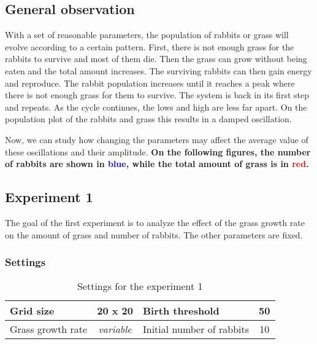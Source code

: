 \documentclass[11pt]{article}
\begin{document}


\subsection{General observation}
With a set of reasonable parameters, the population of rabbits or grass will evolve according to a certain pattern. First, there is not enough grass for the rabbits to survive and most of them die. Then the grass can grow without being eaten and the total amount increases. The surviving rabbits can then gain energy and reproduce. The rabbit population increases until it reaches a peak where there is not enough grass for them to survive. The system is back in its first step and repeats. As the cycle continues, the lows and high are less far apart. On the population plot of the rabbits and grass this results in a damped oscillation. 

Now, we can study how changing the parameters may affect the average value of these oscillations and their amplitude. \textbf{On the following figures, the number of rabbits are shown in \textcolor{blue}{blue}, while the total amount of grass is in \textcolor{red}{red}.}

\subsection{Experiment 1}
The goal of the first experiment is to analyze the effect of the grass growth rate on the amount of grass and number of rabbits. The other parameters are fixed.

\subsubsection{Settings}

\begin{table}[H]
\centering
\begin{tabular}{|l|c||l|c|}
\hline
Grid size         & 20 x 20             & Birth threshold           & 50 \\ \hline
Grass growth rate & \textit{variable}   & Initial number of rabbits & 10 \\ \hline
\end{tabular}
\caption{Settings for the experiment 1}
\end{table}
\end{document}
